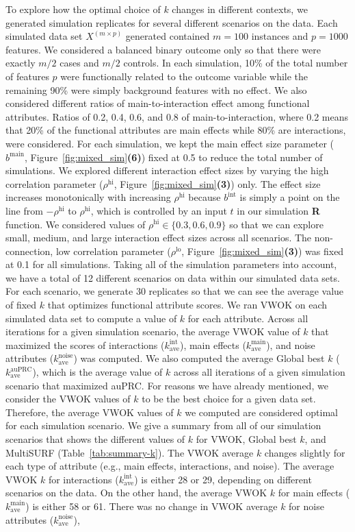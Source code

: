 \documentclass[10pt,letterpaper]{article}
\begin{document}
To explore how the optimal choice of $k$ changes in different contexts, we generated simulation replicates for several different scenarios on the data. Each simulated data set $X^{(m \times p)}$ generated contained $m=100$ instances and $p=1000$ features. We considered a balanced binary outcome only so that there were exactly $m/2$ cases and $m/2$ controls. In each simulation, 10\% of the total number of features $p$ were functionally related to the outcome variable while the remaining 90\% were simply background features with no effect. We also considered different ratios of main-to-interaction effect among functional attributes. Ratios of 0.2, 0.4, 0.6, and 0.8 of main-to-interaction, where 0.2 means that 20\% of the functional attributes are main effects while 80\% are interactions, were considered. For each simulation, we kept the main effect size parameter ($b^\text{main}$, Figure~\ref{fig:mixed_sim}\textbf{(6)}) fixed at 0.5 to reduce the total number of simulations. We explored different interaction effect sizes by varying the high correlation parameter ($\rho^\text{hi}$, Figure~\ref{fig:mixed_sim}\textbf{(3)}) only. The effect size increases monotonically with increasing $\rho^\text{hi}$ because $b^\text{int}$ is simply a point on the line from $-\rho^\text{hi}$ to $\rho^\text{hi}$, which is controlled by an input $t$ in our simulation \textbf{\textsf{R}} function. We considered values of $\rho^\text{hi} \in \{0.3,0.6,0.9\}$ so that we can explore small, medium, and large interaction effect sizes across all scenarios. The non-connection, low correlation parameter ($\rho^\text{lo}$, Figure~\ref{fig:mixed_sim}\textbf{(3)}) was fixed at 0.1 for all simulations. Taking all of the simulation parameters into account, we have a total of 12 different scenarios on data within our simulated data sets. For each scenario, we generate 30 replicates so that we can see the average value of fixed $k$ that optimizes functional attribute scores. We ran VWOK on each simulated data set to compute a value of $k$ for each attribute. Across all iterations for a given simulation scenario, the average VWOK value of $k$ that maximized the scores of interactions ($k^\text{int}_\text{ave}$), main effects ($k^\text{main}_\text{ave}$), and noise attributes ($k^\text{noise}_\text{ave}$) was computed. We also computed the average Global best $k$ ($k^\text{auPRC}_\text{ave}$), which is the average value of $k$ across all iterations of a given simulation scenario that maximized auPRC. For reasons we have already mentioned, we consider the VWOK values of $k$ to be the best choice for a given data set. Therefore, the average VWOK values of $k$ we computed are considered optimal for each simulation scenario. We give a summary from all of our simulation scenarios that shows the different values of $k$ for VWOK, Global best $k$, and MultiSURF (Table~\ref{tab:summary-k}). The VWOK average $k$ changes slightly for each type of attribute (e.g., main effects, interactions, and noise). The average VWOK $k$ for interactions ($k^\text{int}_\text{ave}$) is either 28 or 29, depending on different scenarios on the data. On the other hand, the average VWOK $k$ for main effects ($k^\text{main}_\text{ave}$) is either 58 or 61. There was no change in VWOK average $k$ for noise attributes ($k^\text{noise}_\text{ave}$), 
\end{document}
